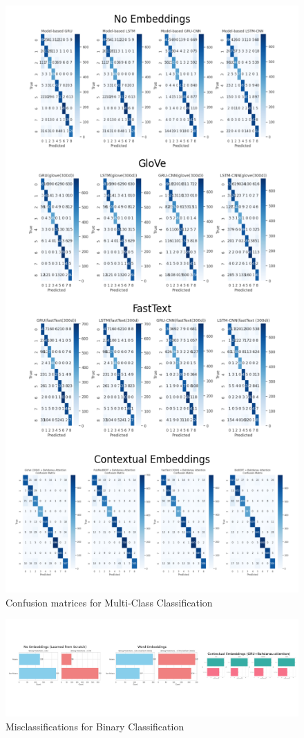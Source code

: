 \documentclass[12pt]{report}
\begin{document}
\begin{figure}[H]
\centering
\includegraphics[width=0.8\linewidth]{cm_multi.png}
\caption{Confusion matrices for Multi-Class Classification}
\label{fig:cm_multi}
\end{figure}

\begin{figure}[H]
\centering
\includegraphics[width=0.8\linewidth]{binary_misclass_results.png}
\caption{Misclassifications for Binary Classification}
\label{fig:binary_misclass}
\end{figure}
\end{document}

